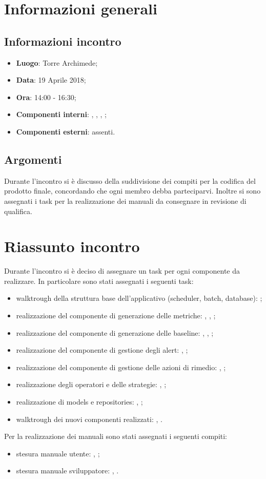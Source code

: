 \section{Informazioni generali}
\subsection{Informazioni incontro}
\begin{itemize}
\item \textbf{Luogo}: Torre Archimede;
\item \textbf{Data}: 19 Aprile 2018;
\item \textbf{Ora}: 14:00 - 16:30;
\item \textbf{Componenti interni}: \Tommaso, \Mattia, \Leonardo, \Isacco;
\item \textbf{Componenti esterni}: assenti.
\end{itemize}

\subsection{Argomenti}
Durante l'incontro si è discusso della suddivisione dei compiti per la codifica del prodotto finale, concordando che ogni membro debba parteciparvi. Inoltre si sono assegnati i task per la realizzazione dei manuali da consegnare in revisione di qualifica.

\section{Riassunto incontro}
Durante l'incontro si è deciso di assegnare un task per ogni componente da realizzare. In particolare sono stati assegnati i seguenti task:
\begin{itemize}
	\item walktrough della struttura base dell'applicativo (scheduler, batch, database): \Leonardo{};
	\item realizzazione del componente di generazione delle metriche: \Luca{}, \Mattia{}, \Carlo{};
	\item realizzazione del componente di generazione delle baseline: \Mattia{}, \Carlo{}, \Isacco{};
	\item realizzazione del componente di gestione degli alert: \Carlo{}, \Isacco{};
	\item realizzazione del componente di gestione delle azioni di rimedio: \Isacco{}, \Luca{};
	\item realizzazione degli operatori e delle strategie: \Luca{}, \Mattia{};
	\item realizzazione di models e repositories: \Mattia{}, \Carlo{};
	\item walktrough dei nuovi componenti realizzati: \Tommaso{}, \Cristian{}.
\end{itemize}
Per la realizzazione dei manuali sono stati assegnati i seguenti compiti:
\begin{itemize}
	\item stesura manuale utente: \Leonardo{}, \Carlo{};
	\item stesura manuale sviluppatore: \Leonardo{}, \Luca{}.
\end{itemize}

